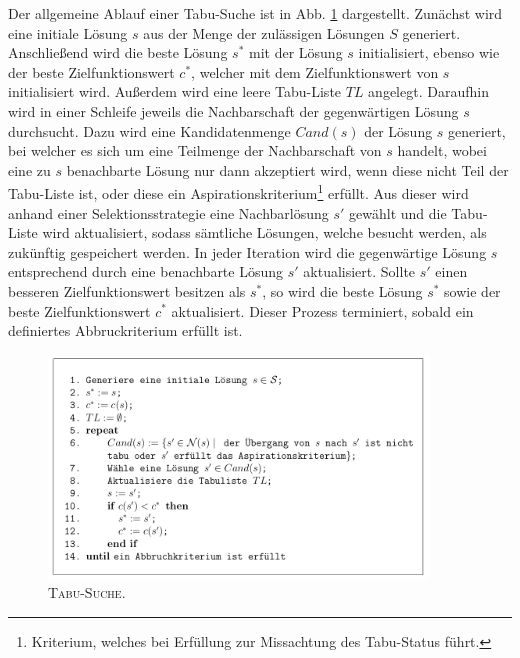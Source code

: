 Der allgemeine Ablauf einer Tabu-Suche ist in Abb. \ref{fig:tabu_search_algo}
dargestellt. Zunächst wird eine initiale Lösung $s$ aus der Menge der zulässigen Lösungen $S$ generiert.
Anschließend wird die beste Lösung $s^*$ mit der Lösung $s$ initialisiert, ebenso wie der beste Zielfunktionswert
$c^*$, welcher mit dem Zielfunktionswert von $s$ initialisiert wird. Außerdem wird eine leere Tabu-Liste $TL$
angelegt. Daraufhin wird in einer Schleife jeweils die Nachbarschaft der gegenwärtigen Lösung $s$ durchsucht. Dazu wird eine
Kandidatenmenge $Cand(s)$ der Lösung $s$ generiert, bei welcher es sich um eine Teilmenge der Nachbarschaft von $s$
handelt, wobei eine zu $s$ benachbarte Lösung nur dann akzeptiert wird, wenn diese nicht Teil der Tabu-Liste ist,
oder diese ein Aspirationskriterium\footnote{Kriterium, welches bei Erfüllung zur Missachtung des Tabu-Status führt.} erfüllt. Aus dieser wird anhand einer Selektionsstrategie eine Nachbarlösung $s'$ gewählt und die Tabu-Liste wird aktualisiert, sodass sämtliche Lösungen, welche besucht werden, als zukünftig  gespeichert werden. In jeder Iteration wird die gegenwärtige Lösung $s$ entsprechend durch eine benachbarte Lösung $s'$ aktualisiert.
Sollte $s'$ einen besseren Zielfunktionswert besitzen als $s^*$, so wird die beste Lösung $s^*$
sowie der beste Zielfunktionswert $c^*$ aktualisiert. Dieser Prozess terminiert, sobald ein definiertes
Abbruckriterium erfüllt ist.

\begin{figure}[H]
\centering
\includegraphics[width=0.9\textwidth]{img/tabu_search_algo_placeholder.png}
\caption{\textsc{Tabu-Suche. \cite{Knust2017}}}
\label{fig:tabu_search_algo}
\end{figure}

